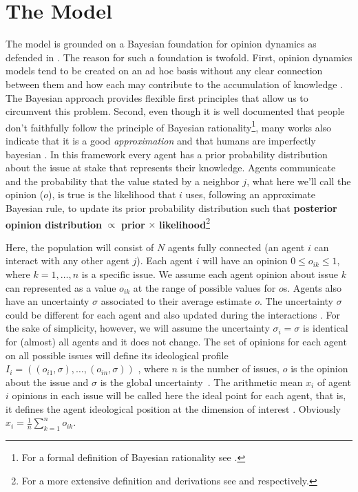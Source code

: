 \documentclass{article}
\begin{document}
\section{The Model}
The model is grounded on a Bayesian foundation for opinion dynamics as defended
in \cite{martins12b}. The reason for such a foundation is twofold. First,
opinion dynamics models tend to be created on an ad hoc basis without any clear
connection between them and how each may contribute to the accumulation of
knowledge \cite{flache2017}. The Bayesian approach provides flexible first
principles that allow us to circumvent this problem. Second, even though it is
well documented that people don't faithfully follow the principle of Bayesian
rationality\footnote{For a formal definition of Bayesian rationality see
  \cite[p.104]{gintis2016individuality}.}, many works also indicate that it is a
good \textit{approximation} and that humans are imperfectly bayesian
\cite{tenenbaumetal07,kempetal10a, teglasetal11a, martins05b,
  gintis2016individuality, baker2017rational}. In this framework every agent has
a prior probability distribution about the issue at stake that represents their
knowledge. Agents communicate and the probability that the value stated by a
neighbor $j$, what here we'll call the opinion (\(o\)), is true is the
likelihood that $i$ uses, following an approximate Bayesian rule, to update its
prior probability distribution such that \textbf{posterior opinion distribution}
$\propto$ \textbf{prior} $\times$ \textbf{likelihood}\footnote{For a more
  extensive definition and derivations see \cite{martins12b} and
  \cite{martins2009bayesian} respectively.}

Here, the population will consist of \(N\) agents fully connected (an agent $i$
can interact with any other agent $j$). Each agent $i$ will have an opinion
$0\leq o_{ik} \leq 1$, where $k=1, \ldots, n$ is a specific issue. We assume
each agent opinion about issue $k$ can represented as a value $o_{ik}$ at the
range of possible values for $o$s. Agents also have an uncertainty $\sigma$
associated to their average estimate $o$. The uncertainty $\sigma$ could be
different for each agent and also updated during the interactions
\cite{martins08c}. For the sake of simplicity, however, we will assume the
uncertainty $\sigma_i =\sigma$ is identical for (almost) all agents and it does
not change. The set of opinions for each agent on all possible issues will
define its ideological profile
\(I_i
=
(
(o_{i 1}, \sigma),
\ldots,
(o_{i n}, \sigma)
)
\)
, where \(n\) is the number of issues, \(o\) is the opinion about the issue and
\(\sigma\) is the global uncertainty~\cite{martins2009bayesian}. The arithmetic mean
$x_i$ of agent $i$ opinions in each issue will be called here the ideal point
for each agent, that is, it defines the agent ideological position at the
dimension of interest \cite{armstrong2014analyzing}. Obviously
\(
x_i
=
\frac{1}{n}
\sum_{k=1}^{n}
o_{ik}
\).
\end{document}
